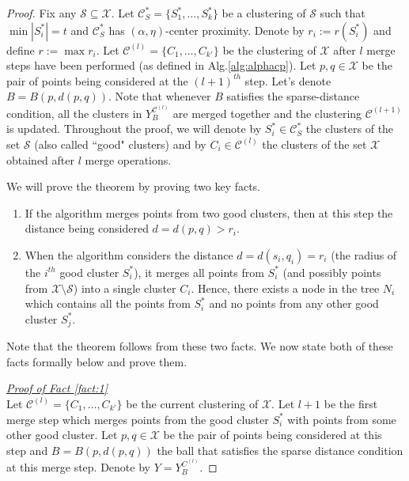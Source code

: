 \documentclass[anon,12pt]{colt2016} %
\newcommand{\mc}{\mathcal}
\begin{document}
\begin{proof}
Fix any $\mc S \subseteq \mc X$. Let $\mc C^*_S = \{S_1^*, \ldots, S_k^*\}$ be a clustering of $\mc S$ such that $\min |S_i^*| = t$ and $\mc C^*_S$ has $(\alpha, \eta)$-center proximity. Denote by $r_i := r(S_i^*)$ and define $r := \max r_i$. Let $\mc C^{(l)} = \{C_1, \ldots, C_{k'}\}$ be the clustering of $\mc X$ after $l$ merge steps have been performed (as defined in Alg.\ref{alg:alphacp}). Let $p, q \in \mc X$ be the pair of points being considered at the $(l+1)^{th}$ step. Let's denote $B = B(p, d(p, q))$. Note that whenever $B$ satisfies the sparse-distance condition, all the clusters in $Y_{B}^{{\mc C}^{(l)}}$ are merged together and the clustering $\mc C^{(l+1)}$ is updated. Throughout the proof, we will denote by $S_i^* \in \mc C^*_S$ the clusters of the set $\mc S$ (also called ``good" clusters) and by $C_i \in \mc C^{(l)}$ the clusters of the set $\mc X$ obtained after $l$ merge operations.

\noindent We will prove the theorem by proving two key facts.

\begin{enumerate}[nolistsep, noitemsep, label=\textbf{F.\arabic*}]
\renewcommand\labelitemi{$\diamond$}
\item \label{fact:1} If the algorithm merges points from two good clusters, then at this step the distance being considered $d = d(p,q) > r_i$.	
\item \label{fact:2} When the algorithm considers the distance $d = d(s_i, q_i) = r_i$ (the radius of the $i^{th}$ good cluster $S_i^*$), it merges all points from $S_i^*$ (and possibly points from $\mc X\setminus \mc S$) into a single cluster $C_i$. Hence, there exists a node in the tree $N_i$ which contains all the points from $S_i^*$ and no points from any other good cluster $S_j^*$. 	
\end{enumerate}
Note that the theorem follows from these two facts. We now state both of these facts formally below and prove them.

\noindent\textit{\underline{Proof of Fact \ref{fact:1} %
}}\\
Let $\mc C^{(l)} = \{C_1, \ldots, C_{k'}\}$ be the current clustering of $\mc X$. Let $l+1$ be the first merge step which merges points from the good cluster $S_i^*$ with points from some other good cluster. Let $p, q \in \mc X$ be the pair of points being considered at this step and $B = B(p, d(p, q))$ the ball that satisfies the sparse distance condition at this merge step. Denote by $Y = Y_{B}^{C^{(l)}}$.


\end{proof}
\end{document}
